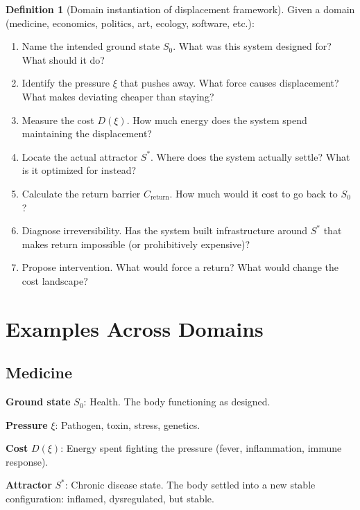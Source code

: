 \documentclass[12pt]{article}
\theoremstyle{definition}
\newtheorem{definition}[theorem]{Definition}
\theoremstyle{remark}
\begin{document}
\begin{definition}[Domain instantiation of displacement framework]
Given a domain (medicine, economics, politics, art, ecology, software, etc.):

\begin{enumerate}
\item Name the intended ground state $S_0$. What was this system designed for? What should it do?

\item Identify the pressure $\xi$ that pushes away. What force causes displacement? What makes deviating cheaper than staying?

\item Measure the cost $D(\xi)$. How much energy does the system spend maintaining the displacement?

\item Locate the actual attractor $S^*$. Where does the system actually settle? What is it optimized for instead?

\item Calculate the return barrier $C_{\text{return}}$. How much would it cost to go back to $S_0$?

\item Diagnose irreversibility. Has the system built infrastructure around $S^*$ that makes return impossible (or prohibitively expensive)?

\item Propose intervention. What would force a return? What would change the cost landscape?
\end{enumerate}
\end{definition}

\section{Examples Across Domains}

\subsection{Medicine}

\textbf{Ground state} $S_0$: Health. The body functioning as designed.

\textbf{Pressure} $\xi$: Pathogen, toxin, stress, genetics.

\textbf{Cost} $D(\xi)$: Energy spent fighting the pressure (fever, inflammation, immune response).

\textbf{Attractor} $S^*$: Chronic disease state. The body settled into a new stable configuration: inflamed, dysregulated, but stable.
\end{document}
